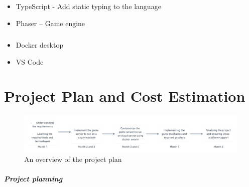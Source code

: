 \documentclass[oneside,12pt]{Classes/VTU}
\begin{document}
	\paragraph{}
	\begin{itemize}
		\item TypeScript - Add static typing to the language
		\item Phaser – Game engine
	\end{itemize}
	
	\paragraph{}
	\begin{itemize}
		\item Docker desktop
		\item VS Code
	\end{itemize}
	\paragraph{}
	
	
	
\chapter{Project Plan and Cost Estimation}
	\thispagestyle{fancy}
	\begin{figure}[ht!]
		\includegraphics[width=\linewidth]{plan.png}
		\centering
		\caption{An overview of the project plan}
		\label{fig:plan}
	\end{figure}
	
	\paragraph{\LARGE{Project planning}}
\end{document}
